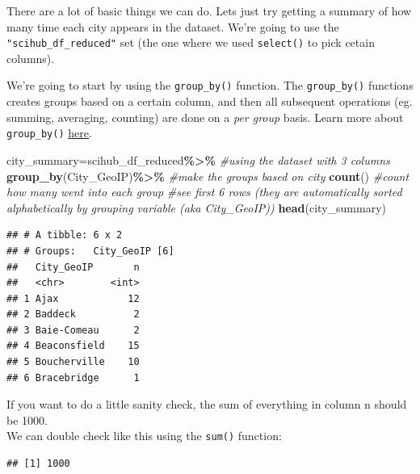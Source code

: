 \documentclass[
]{article}
\newenvironment{Shaded}{\begin{snugshade}}{\end{snugshade}}
\newcommand{\CommentTok}[1]{\textcolor[rgb]{0.56,0.35,0.01}{\textit{#1}}}
\newcommand{\FunctionTok}[1]{\textcolor[rgb]{0.13,0.29,0.53}{\textbf{#1}}}
\newcommand{\NormalTok}[1]{#1}
\newcommand{\OtherTok}[1]{\textcolor[rgb]{0.56,0.35,0.01}{#1}}
\newcommand{\SpecialCharTok}[1]{\textcolor[rgb]{0.81,0.36,0.00}{\textbf{#1}}}
\begin{document}
There are a lot of basic things we can do. Lets just try getting a
summary of how many time each city appears in the dataset. We're going
to use the \texttt{"scihub\_df\_reduced"} set (the one where we used
\texttt{select()} to pick cetain columns).

We're going to start by using the \texttt{group\_by()} function. The
\texttt{group\_by()} functions creates groups based on a certain column,
and then all subsequent operations (eg. summing, averaging, counting)
are done on a \emph{per group} basis. Learn more about
\texttt{group\_by()}
\href{https://r4ds.hadley.nz/data-transform.html}{here}.

\begin{Shaded}
\begin{Highlighting}[]
\NormalTok{city\_summary}\OtherTok{=}\NormalTok{scihub\_df\_reduced}\SpecialCharTok{\%\textgreater{}\%} \CommentTok{\#using the dataset with 3 columns }
  \FunctionTok{group\_by}\NormalTok{(City\_GeoIP)}\SpecialCharTok{\%\textgreater{}\%} \CommentTok{\#make the groups based on city }
  \FunctionTok{count}\NormalTok{() }\CommentTok{\#count how many went into each group }
\CommentTok{\#see first 6 rows (they are automatically sorted alphabetically by grouping variable (aka City\_GeoIP))}
\FunctionTok{head}\NormalTok{(city\_summary)}
\end{Highlighting}
\end{Shaded}

\begin{verbatim}
## # A tibble: 6 x 2
## # Groups:   City_GeoIP [6]
##   City_GeoIP       n
##   <chr>        <int>
## 1 Ajax            12
## 2 Baddeck          2
## 3 Baie-Comeau      2
## 4 Beaconsfield    15
## 5 Boucherville    10
## 6 Bracebridge      1
\end{verbatim}

If you want to do a little sanity check, the sum of everything in column
n should be 1000.\\
We can double check like this using the \texttt{sum()} function:

\begin{Shaded}
\end{Shaded}

\begin{verbatim}
## [1] 1000
\end{verbatim}
\end{document}

